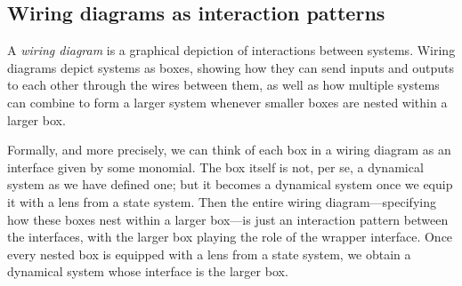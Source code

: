 \documentclass[Book-Poly]{subfiles}
\begin{document}
\subsection{Wiring diagrams as interaction patterns}

A \emph{wiring diagram} is a graphical depiction of interactions between systems.
Wiring diagrams depict systems as boxes, showing how they can send inputs and outputs to each other through the wires between them, as well as how multiple systems can combine to form a larger system whenever smaller boxes are nested within a larger box.

Formally, and more precisely, we can think of each box in a wiring diagram as an interface given by some monomial.
The box itself is not, per se, a dynamical system as we have defined one; but it becomes a dynamical system once we equip it with a lens from a state system.
Then the entire wiring diagram---specifying how these boxes nest within a larger box---is just an interaction pattern between the interfaces, with the larger box playing the role of the wrapper interface.
Once every nested box is equipped with a lens from a state system, we obtain a dynamical system whose interface is the larger box.
\end{document}
